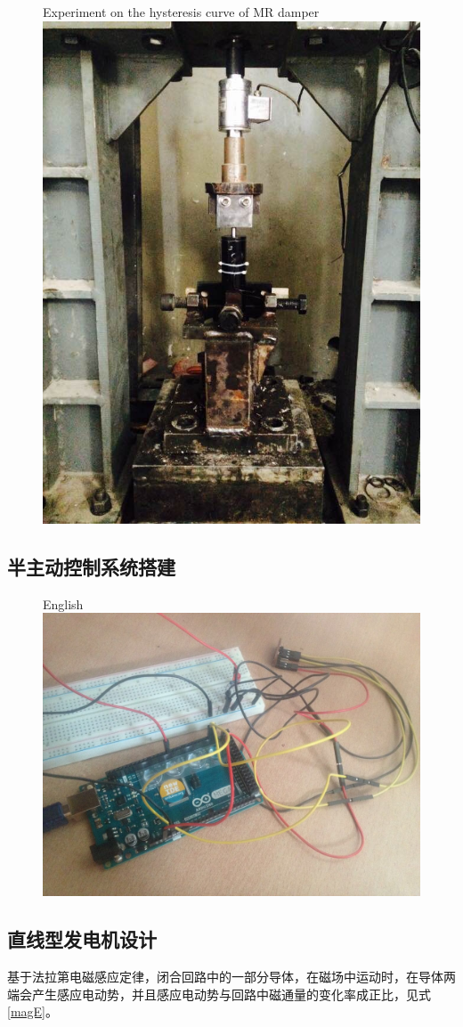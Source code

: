 \begin{figure}[H]
	\centering
		{Experiment on the hysteresis curve of MR damper}
	\label{shiyan}
	\includegraphics[width=.5\linewidth]{figure/shiyan}
\end{figure}








\subsection{半主动控制系统搭建}

\begin{figure}[H]
	\centering
		{English}
	\label{arduino}
	\includegraphics[width=.5\linewidth]{figure/arduino}
\end{figure}




\subsection{直线型发电机设计}
基于法拉第电磁感应定律，闭合回路中的一部分导体，在磁场中运动时，在导体两端会产生感应电动势，并且感应电动势与回路中磁通量的变化率成正比\cite{elliott1993}，见式\eqref{magE}。

